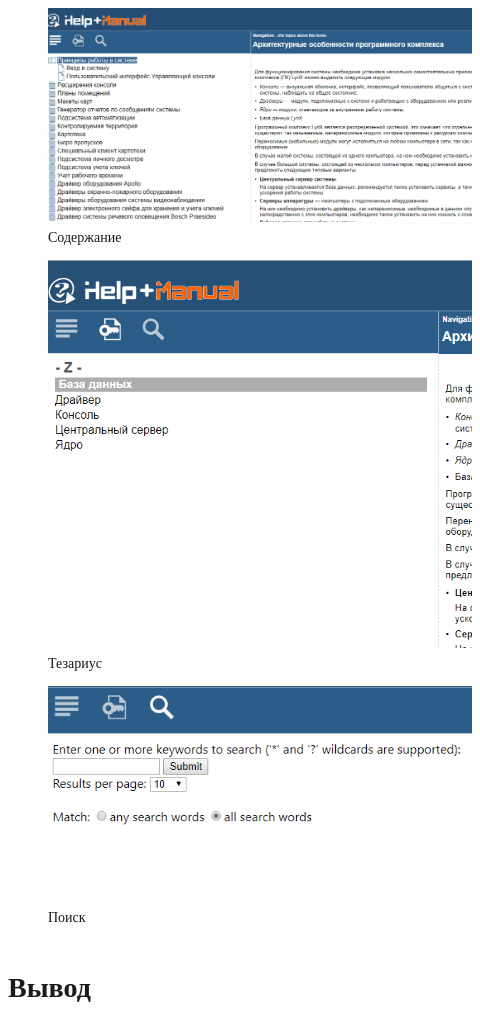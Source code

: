 		\begin{figure}[h]
			\centering
			\includegraphics[width=0.7\linewidth]{images/table-of-content}
			\caption{Содержание}
			\label{fig:table-of-content}
		\end{figure}
		\begin{figure}[h]
			\centering
			\includegraphics[width=0.7\linewidth]{images/ketword-index}
			\caption{Тезариус}
			\label{fig:ketword-index}
		\end{figure}
		\begin{figure}[h]
			\centering
			\includegraphics[width=0.7\linewidth]{images/search}
			\caption{Поиск}
			\label{fig:search}
		\end{figure}
	
		\FloatBarrier
		
		
		
	\section{Вывод}